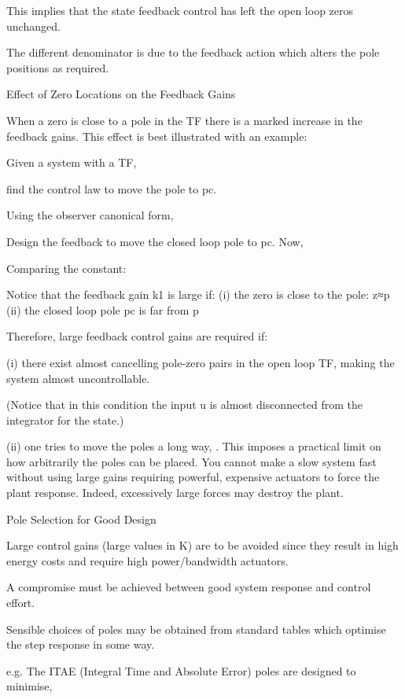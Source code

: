 This implies that the state feedback control has left the open loop zeros unchanged.

The different denominator is due to the feedback action which alters the pole positions as required.
 
Effect of Zero Locations on the Feedback Gains

When a zero is close to a pole in the TF there is a marked increase in the feedback gains. This effect is best illustrated with an example:

Given a system with a TF,
 
find the control law to move the pole to  pc.

Using the observer canonical form,
 
Design the feedback to move the closed loop pole to pc.
Now,
 
Comparing the constant:
 
 
Notice that the feedback gain  k1  is large if:
(i)	the zero is close to the pole:    z≈p
(ii)	the closed loop pole pc   is far from  p

Therefore, large feedback control gains are required if:

(i)	there exist almost cancelling pole-zero pairs in the open loop TF, making the system almost uncontrollable.







(Notice that in this condition the input  u  is almost disconnected from the integrator for the state.)

(ii)	one tries to move the poles a long way,
 .  This imposes a practical limit on how arbitrarily the poles can be placed. You cannot make a slow system fast without using large gains requiring powerful, expensive actuators to force the plant response. Indeed, excessively large forces may destroy the plant.
 
Pole Selection for Good Design

Large control gains (large values in K) are to be avoided since they result in high energy costs and require high power/bandwidth actuators.

A compromise must be achieved between good system response and control effort.

Sensible choices of poles may be obtained from standard tables which optimise the step response in some way.

e.g. The ITAE (Integral Time and Absolute Error) poles are designed to minimise,
 
